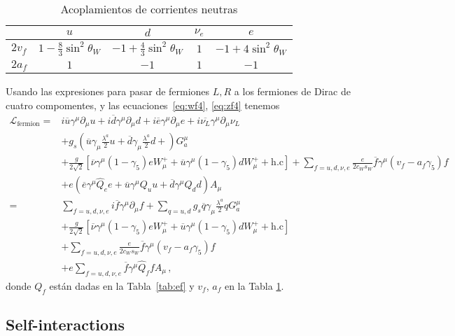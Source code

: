 \begin{frame}
\begin{table}  %
  \centering %
  \begin{tabular}{l|c|c|c|c} %
   &$u$&$d$&$\nu_e$&$e$\\\hline{}
$2v_f$&$1-\frac{8}{3}\sin^2\theta_W$&$-1+\frac{4}{3}\sin^2\theta_W$&$1$&$-1+4\sin^2\theta_W$\\
$2a_f$&$1$&$-1$&$1$&$-1$\\
  \end{tabular} %
  \caption{Acoplamientos de corrientes neutras} %
\label{tab:zcoup}
\end{table} %


Usando las expresiones para pasar de fermiones $L,R$ a los fermiones de Dirac de cuatro compomentes, y las ecuaciones~\eqref{eq:wf4}, \eqref{eq:zf4} tenemos
\begin{align}
\label{eq:lfermionfin}
   \mathcal{L}_{\text{fermion}}
  =&i\overline{u}\gamma^\mu\partial_\mu u+i\overline{d}\gamma^\mu\partial_\mu d+i\overline{e}\gamma^\mu{\partial}_\mu e
+i\overline{\nu_L}\gamma^\mu{\partial}_\mu \nu_L\nonumber\\
&+g_s \left(\overline{u}\gamma_\mu\frac{\lambda^a}{2}u
+\overline{d}\gamma_\mu\frac{\lambda^a}{2}d+ \right)G^\mu_a\nonumber\\
&+\frac{g}{2\sqrt{2}}\left[\overline{\nu}\gamma^\mu(1-\gamma_5)eW_\mu^++
\overline{u}\gamma^\mu(1-\gamma_5)d W_\mu^++\text{h.c}\right]
+\sum_{f=u,d,\nu,e}\frac{e}{2c_W s_W}\overline{f}\gamma^\mu\left(v_f-a_f\gamma_5\right)f\nonumber\\
&+e\left(\overline{e}\gamma^\mu \widehat{Q}_e e+
\overline{u}\gamma^\mu {Q}_u u+
\overline{d}\gamma^\mu {Q}_d d\right) A_\mu\nonumber\\
    =&\sum_{f=u,d,\nu,e}i\overline{f}\gamma^\mu\partial_\mu f+\sum_{q=u,d}g_s\overline{q}\gamma_\mu\frac{\lambda^a}{2}qG^\mu_a\nonumber\\
&+\frac{g}{2\sqrt{2}}\left[\overline{\nu}\gamma^\mu(1-\gamma_5)eW_\mu^++
\overline{u}\gamma^\mu(1-\gamma_5)d W_\mu^++\text{h.c}\right]\nonumber\\
&+\sum_{f=u,d,\nu,e}\frac{e}{2c_W s_W}\overline{f}\gamma^\mu\left(v_f-a_f\gamma_5\right)f\nonumber\\
&+e\sum_{f=u,d,\nu,e}\overline{f}\gamma^\mu \widehat{Q}_f f A_\mu\,,
\end{align}
donde $Q_f$ están dadas en la Tabla~\ref{tab:ef} y $v_f$, $a_f$ en la Tabla \ref{tab:zcoup}.
\end{frame}
\subsection{Self-interactions}


